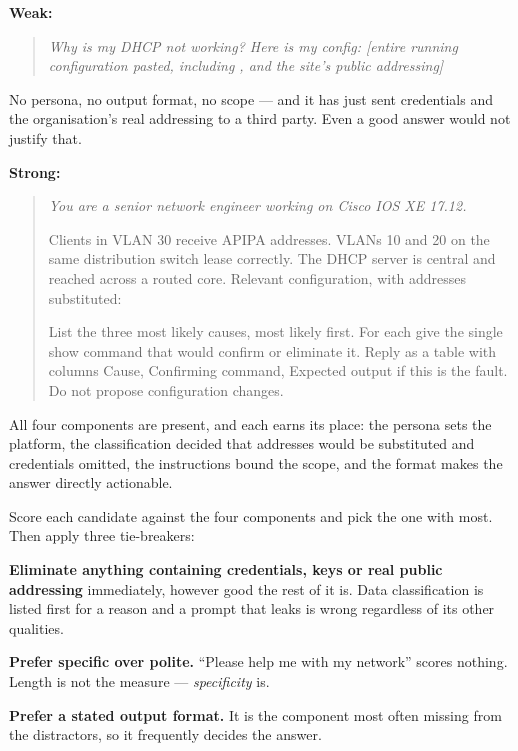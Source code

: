 \begin{worked}
\textbf{Weak:}

\begin{quote}
\RaggedRight\itshape Why is my DHCP not working? Here is my config:
[entire running configuration pasted, including ,
 and the site's public addressing]
\end{quote}

No persona, no output format, no scope --- and it has just sent credentials and
the organisation's real addressing to a third party. Even a good answer would not
justify that.

\textbf{Strong:}

\begin{quote}
\RaggedRight\itshape You are a senior network engineer working on Cisco IOS XE
17.12.

Clients in VLAN 30 receive APIPA addresses. VLANs 10 and 20 on the same
distribution switch lease correctly. The DHCP server is central and reached
across a routed core. Relevant configuration, with addresses substituted:

\medskip
{}

\medskip
List the three most likely causes, most likely first. For each give the single
show command that would confirm or eliminate it. Reply as a table with columns
Cause, Confirming command, Expected output if this is the fault. Do not propose
configuration changes.
\end{quote}

All four components are present, and each earns its place: the persona sets the
platform, the classification decided that addresses would be substituted and
credentials omitted, the instructions bound the scope, and the format makes the
answer directly actionable.
\end{worked}

\begin{examnote}
Score each candidate against the four components and pick the one with most.
Then apply three tie-breakers:

\begin{tight}
  \item \textbf{Eliminate anything containing credentials, keys or real public
        addressing} immediately, however good the rest of it is. Data
        classification is listed first for a reason and a prompt that leaks is
        wrong regardless of its other qualities.
  \item \textbf{Prefer specific over polite.} ``Please help me with my network''
        scores nothing. Length is not the measure --- \emph{specificity} is.
  \item \textbf{Prefer a stated output format.} It is the component most often
        missing from the distractors, so it frequently decides the answer.
\end{tight}
\end{examnote}

